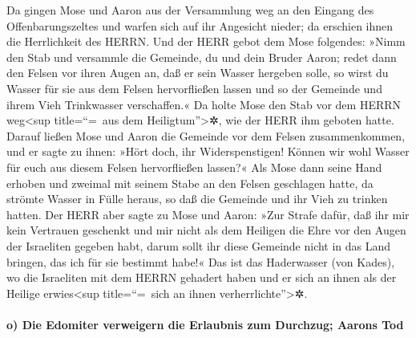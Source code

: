 Da gingen Mose und Aaron aus der Versammlung weg an den
Eingang des Offenbarungszeltes und warfen sich auf ihr Angesicht nieder;
da erschien ihnen die Herrlichkeit des HERRN. Und der HERR
gebot dem Mose folgendes: »Nimm den Stab und versammle die Gemeinde, du
und dein Bruder Aaron; redet dann den Felsen vor ihren Augen an, daß er
sein Wasser hergeben solle, so wirst du Wasser für sie aus
dem Felsen hervorfließen lassen und so der Gemeinde und ihrem Vieh
Trinkwasser verschaffen.« Da holte Mose den Stab vor dem
HERRN weg\textless sup title=``=~aus dem Heiligtum''\textgreater✲, wie
der HERR ihm geboten hatte. Darauf ließen Mose und Aaron
die Gemeinde vor dem Felsen zusammenkommen, und er sagte zu ihnen: »Hört
doch, ihr Widerspenstigen! Können wir wohl Wasser für euch aus diesem
Felsen hervorfließen lassen?« Als Mose dann seine Hand
erhoben und zweimal mit seinem Stabe an den Felsen geschlagen hatte, da
strömte Wasser in Fülle heraus, so daß die Gemeinde und ihr Vieh zu
trinken hatten. Der HERR aber sagte zu Mose und Aaron:
»Zur Strafe dafür, daß ihr mir kein Vertrauen geschenkt und mir nicht
als dem Heiligen die Ehre vor den Augen der Israeliten gegeben habt,
darum sollt ihr diese Gemeinde nicht in das Land bringen, das ich für
sie bestimmt habe!« Das ist das Haderwasser (von Kades),
wo die Israeliten mit dem HERRN gehadert haben und er sich an ihnen als
der Heilige erwies\textless sup title=``=~sich an ihnen
verherrlichte''\textgreater✲.

\hypertarget{o-die-edomiter-verweigern-die-erlaubnis-zum-durchzug-aarons-tod}{%
\paragraph{o) Die Edomiter verweigern die Erlaubnis zum Durchzug; Aarons
Tod}\label{o-die-edomiter-verweigern-die-erlaubnis-zum-durchzug-aarons-tod}}

